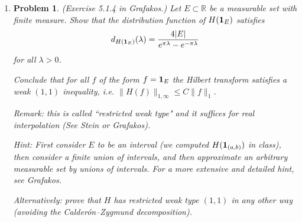 \documentclass[a4paper]{article}
\newtheorem*{problem}{Problem}
\newcommand{\la}{\left \langle}
\newcommand{\ra}{\right \rangle}
\begin{document}
\begin{enumerate}
  \begin{proof}

    Let $g \in \mathcal{S}$. Then
    \begin{align*}
      \la H(\cos x), g \ra &= \la \cos x, H^{\ast} g \ra \\
      &= \la (\cos x)^{\check{}}, (H^{\ast} g)^{\widehat{}} \ \ra \\
      &= \la (\cos x)^{\check{}}(\xi), i \textup{ sgn} (\xi) \widehat{g}(\xi) \ra \quad \parbox{6cm}{because $H^\ast = -H$ and using the Hilbert
      transform's Fourier multiplier} \\
      &= \int_{-\infty}^{\infty} \frac{1}{2} \left( \delta(\xi - 1) + \delta(\xi + 1) \right) i \textup{ sgn}(\xi) \widehat{g}(\xi) d\xi \\
      &= \int_{-\infty}^{\infty} \frac{i}{2} \left( \delta(\xi - 1) - \delta(\xi + 1) \right) \widehat{g}(\xi) d\xi \\
      &= \la (\sin x)^{\check{}}, \widehat{g} \ra \\
      &= \la \sin x, g \ra
    \end{align*}

    Therefore, $H(\cos x) = \sin x$.

  \end{proof}

\item
  \begin{problem}
    (Exercise 5.1.4 in Grafakos.)  Let $E \subset \mathbb R$ be a measurable set with finite measure. Show that the distribution function of $H ({\bf{1}}_E)$ satisfies $$ d_{H ({\bf{1}}_E)} (\lambda)  = \frac{ 4|E| }{ e^{\pi \lambda}  - e^{-\pi \lambda}}$$ for all $\lambda >0$.

    Conclude that for all $f$ of the form $f = {\bf{1}}_E$  the Hilbert transform satisfies a weak $(1,1)$ inequality, i.e. $\| H (f) \|_{1,\infty} \le C \| f \|_1$.

    Remark: this is called ``restricted weak type" and it suffices for real interpolation (See Stein or Grafakos).

    Hint: First consider $E$ to be an interval (we computed $H( {\bf{1}}_{(a,b)})$ in class), then consider a finite union of intervals, and then approximate an arbitrary measurable set by unions of intervals. For a more extensive and detailed hint, see Grafakos.

    Alternatively: prove that $H$ has  restricted weak type $(1,1)$ in any other way (avoiding the Calder\'{o}n--Zygmund decomposition).


\end{problem}
\end{enumerate}
\end{document}
